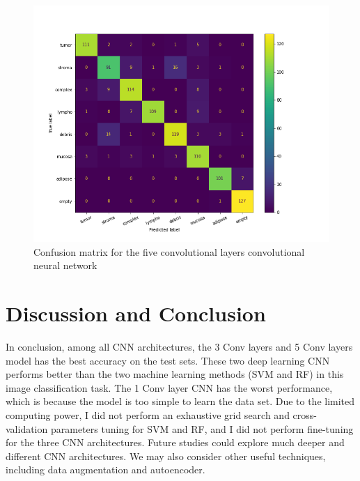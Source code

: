 \documentclass[letterpaper]{article} %
\begin{document}
\begin{figure}[t]
\centering
\includegraphics[width=0.9\columnwidth]{figures/confusion_matrix.png} 
\caption{Confusion matrix for the five convolutional layers convolutional neural network}
\label{cm}
\end{figure}

\section{Discussion and Conclusion}

In conclusion, among all CNN architectures, the 3 Conv layers and  5 Conv layers model has the best accuracy on the test sets. These two deep learning CNN performs better than the two machine learning methods (SVM and RF) in this image classification task. The 1 Conv layer CNN has the worst performance, which is because the model is too simple to learn the data set. Due to the limited computing power, I did not perform an exhaustive grid search and cross-validation parameters tuning for SVM and RF, and I did not perform fine-tuning for the three CNN architectures. Future studies could explore much deeper and different CNN architectures. We may also consider other useful techniques, including data augmentation and autoencoder. 



\appendix



\end{document}
